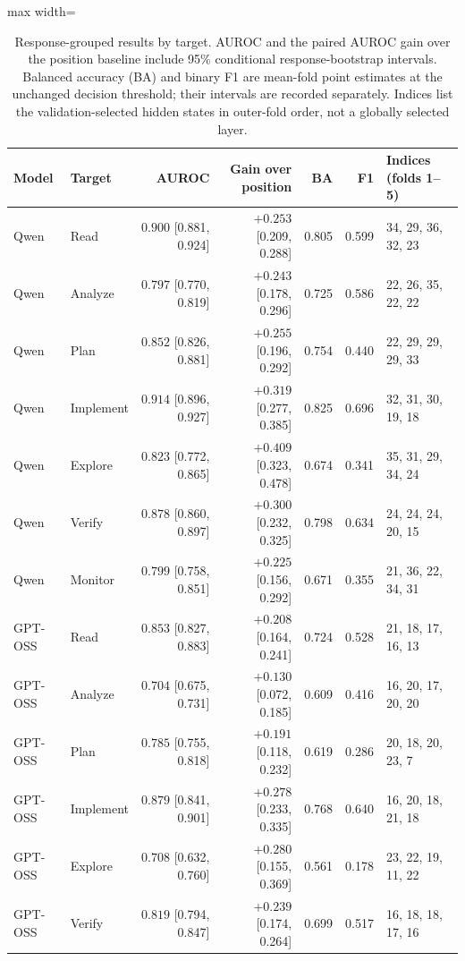 \begin{table}[!ht]
\centering\small
\caption{Response-grouped results by target. AUROC and the paired AUROC gain over the position baseline include 95\% conditional response-bootstrap intervals. Balanced accuracy (BA) and binary F1 are mean-fold point estimates at the unchanged decision threshold; their intervals are recorded separately. Indices list the validation-selected hidden states in outer-fold order, not a globally selected layer.}
\label{tab:probe-grouped-targets}
\begin{adjustbox}{max width=\linewidth}%
\begin{tabular}{llrrrrl}
\toprule
Model & Target & AUROC & Gain over position & BA & F1 & Indices (folds 1--5) \\
\midrule
Qwen & Read & $0.900$ [0.881, 0.924] & $+0.253$ [0.209, 0.288] & 0.805 & 0.599 & 34, 29, 36, 32, 23 \\
Qwen & Analyze & $0.797$ [0.770, 0.819] & $+0.243$ [0.178, 0.296] & 0.725 & 0.586 & 22, 26, 35, 22, 22 \\
Qwen & Plan & $0.852$ [0.826, 0.881] & $+0.255$ [0.196, 0.292] & 0.754 & 0.440 & 22, 29, 29, 29, 33 \\
Qwen & Implement & $0.914$ [0.896, 0.927] & $+0.319$ [0.277, 0.385] & 0.825 & 0.696 & 32, 31, 30, 19, 18 \\
Qwen & Explore & $0.823$ [0.772, 0.865] & $+0.409$ [0.323, 0.478] & 0.674 & 0.341 & 35, 31, 29, 34, 24 \\
Qwen & Verify & $0.878$ [0.860, 0.897] & $+0.300$ [0.232, 0.325] & 0.798 & 0.634 & 24, 24, 24, 20, 15 \\
Qwen & Monitor & $0.799$ [0.758, 0.851] & $+0.225$ [0.156, 0.292] & 0.671 & 0.355 & 21, 36, 22, 34, 31 \\
\midrule
GPT-OSS & Read & $0.853$ [0.827, 0.883] & $+0.208$ [0.164, 0.241] & 0.724 & 0.528 & 21, 18, 17, 16, 13 \\
GPT-OSS & Analyze & $0.704$ [0.675, 0.731] & $+0.130$ [0.072, 0.185] & 0.609 & 0.416 & 16, 20, 17, 20, 20 \\
GPT-OSS & Plan & $0.785$ [0.755, 0.818] & $+0.191$ [0.118, 0.232] & 0.619 & 0.286 & 20, 18, 20, 23, 7 \\
GPT-OSS & Implement & $0.879$ [0.841, 0.901] & $+0.278$ [0.233, 0.335] & 0.768 & 0.640 & 16, 20, 18, 21, 18 \\
GPT-OSS & Explore & $0.708$ [0.632, 0.760] & $+0.280$ [0.155, 0.369] & 0.561 & 0.178 & 23, 22, 19, 11, 22 \\
GPT-OSS & Verify & $0.819$ [0.794, 0.847] & $+0.239$ [0.174, 0.264] & 0.699 & 0.517 & 16, 18, 18, 17, 16 \\

\end{tabular}
\end{adjustbox}
\end{table}
